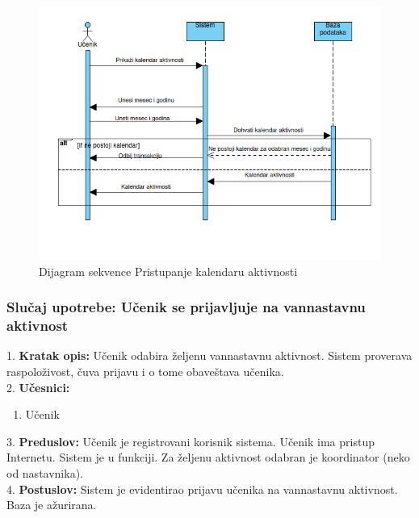 \documentclass{article}
\begin{document}
\begin{figure} [!ht]
    \begin{center}
        \includegraphics[scale=0.5]{imgs/Dijagram_sekvence_ucenik_pristupa_kalendaru.png}
    \end{center}
\caption{Dijagram sekvence Pristupanje kalendaru aktivnosti}
\end{figure}

\newpage
\subsubsection{Slučaj upotrebe: Učenik se prijavljuje na vannastavnu aktivnost} 
1. \textbf{Kratak opis:} Učenik odabira željenu vannastavnu aktivnost. Sistem proverava raspoloživost, čuva prijavu i o tome obaveštava učenika. \\

2. \textbf{Učesnici:}
\begin{enumerate} [label=(\alph*)]
\item Učenik
\end{enumerate} 

3. \textbf{Preduslov:} Učenik je registrovani korisnik sistema. Učenik ima pristup Internetu. Sistem je u funkciji. Za željenu aktivnost odabran je koordinator (neko od nastavnika). \\

4. \textbf{Postuslov:} Sistem je evidentirao prijavu učenika na vannastavnu aktivnost. Baza je ažurirana. \\
\end{document}
